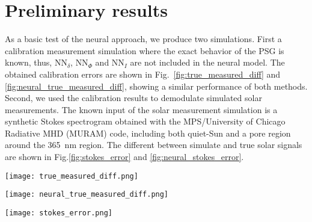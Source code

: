 \documentclass[baaa]{baaa}
\begin{document}
\section{Preliminary results}
As a basic test of the neural approach, we produce two simulations. First a calibration measurement simulation where the exact behavior of the PSG is known, thus, $\text{NN}_\delta$, $\text{NN}_\Phi$ and $\text{NN}_I$ are not included in the neural model. The obtained calibration errors are shown in Fig.~\ref{fig:true_measured_diff} and  \ref{fig:neural_true_measured_diff}, showing a similar performance of both methods. Second, we used the calibration results to demodulate simulated solar measurements. The known input of the solar measurement simulation is a synthetic Stokes spectrogram obtained with the MPS/University of Chicago Radiative MHD ({\sc MURAM}) code, including both quiet-Sun and a pore region around the 365~nm region. The different between simulate and true solar signals are shown in  Fig.\ref{fig:stokes_error} and \ref{fig:neural_stokes_error}.

\begin{figure*}[ht]
    \centering
    \texttt{[image: true\_measured\_diff.png]}
    \caption{True ($\text{S}_{true}$) and measured ($\text{S}_{meas}$) calibration Stokes parameters \emph{(see the panels titles)} for method (b), along with their difference \emph{(Diff., see the legend)}. For all quantities we plot the average over the image area for all the 40 calibration inputs (PSG position). Stokes Q, U and V are normalized with Stokes I and Stokes I is normalized to its value for the first calibration input.}
    \label{fig:true_measured_diff}
\end{figure*}

\begin{figure*}[ht]
    \centering
    \texttt{[image: neural\_true\_measured\_diff.png]}
    \caption{Same as Fig.~\ref{fig:true_measured_diff} for the neural calibration method. Note that the difference is larger than for method (b), however is well below the $1\times10^{-3}$ achieved in real cases.}
    \label{fig:neural_true_measured_diff}
\end{figure*}

\begin{figure*}[ht]
    \centering
    \texttt{[image: stokes\_error.png]}
    \caption{Difference between true and measured Stokes parameters \emph{(see horizontal axes label in each panel)} for the simulated solar measurement, versus Stokes signal level. These errors were obtained using calibration method (b).}
    \label{fig:stokes_error}
\end{figure*}
\end{document}
